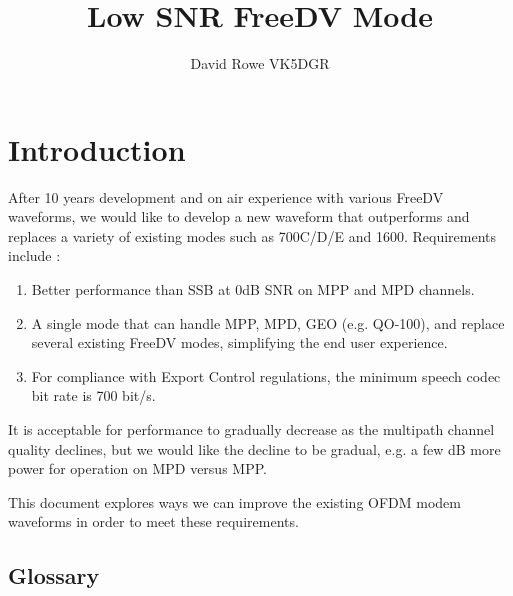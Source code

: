 \documentclass{article}
\begin{document}
\title{Low SNR FreeDV Mode}
\author{David Rowe VK5DGR}
\maketitle


\section{Introduction}

After 10 years development and on air experience with various FreeDV waveforms, we would like to develop a new waveform that outperforms and replaces a variety of existing modes such as 700C/D/E and 1600.  Requirements include \cite{freedv-020}:
\begin{enumerate}
\item Better performance than SSB at 0dB SNR on MPP and MPD channels.
\item A single mode that can handle MPP, MPD, GEO (e.g. QO-100), and replace several existing FreeDV modes, simplifying the end user experience.
\item For compliance with Export Control regulations, the minimum speech codec bit rate is 700 bit/s.
\end{enumerate}
It is acceptable for performance to gradually decrease as the multipath channel quality declines, but we would like the decline to be gradual, e.g. a few dB more power for operation on MPD versus MPP.

This document explores ways we can improve the existing OFDM modem waveforms in order to meet these requirements.

\clearpage

\subsection{Glossary}
\end{document}
